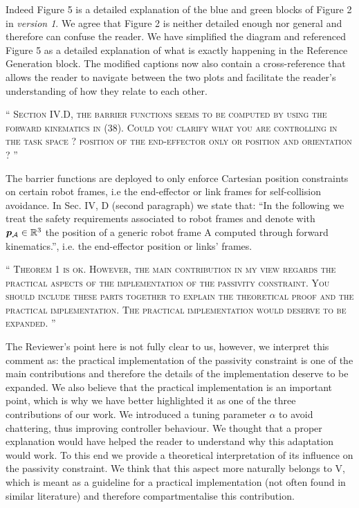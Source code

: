 \documentclass[10pt]{article}
\newcommand{\referee}[1]{\;
  \begin{minipage}[t]{.95\textwidth}
    ``{\small\color{red} \textsc{#1}}''
  \end{minipage}\medskip
  }
\newcommand{\version}[1]{\textit{version #1}}
\begin{document}
\begin{enumerate}[label={[R5:\,\arabic{enumi}]}]
Indeed Figure 5 is a detailed explanation of the blue and green blocks of Figure 2 in \version{1}. We agree that Figure 2 is neither detailed enough nor general and therefore can confuse the reader. We have simplified the diagram and referenced Figure 5 as a detailed explanation of what is exactly happening in the Reference Generation block. The modified captions now also contain a cross-reference that allows the reader to navigate between the two plots and facilitate the reader's understanding of how they relate to each other.

\item\label{reply:R5:7} 
\referee{Section IV.D, the barrier functions seems to be computed by using the forward kinematics in (38). Could you clarify what you are controlling in the task space ? position of the end-effector only or position and orientation ? }

The barrier functions are deployed to only enforce Cartesian position constraints on certain robot frames, i.e the end-effector or link frames for self-collision avoidance. In Sec. IV, D (second paragraph) we state that:
“In the following we treat the safety requirements associated to robot frames and denote with $\bm{p}_\mathcal{A} \in \mathbb{R}^{3}$ the position of a generic robot frame A computed through forward kinematics.”, i.e. the end-effector position or links' frames.

\item\label{reply:R5:8} 
\referee{Theorem 1 is ok. However, the main contribution in my view regards the practical aspects of the implementation of the passivity constraint. You should include these parts together to explain the theoretical proof and the practical implementation.  The practical implementation would deserve to be expanded. }

The Reviewer's point here is not fully clear to us, however, we interpret this comment as: the practical implementation of the passivity constraint is one of the main contributions and therefore the details of the implementation deserve to be expanded. We also believe that the practical implementation is an important point, which is why we have better highlighted it as one of the three contributions of our work. We introduced a tuning parameter $\alpha$ to avoid chattering, thus improving controller behaviour. We thought that a proper explanation would have helped the reader to understand why this adaptation would work. To this end we provide a theoretical interpretation of its influence on the passivity constraint. We think that this aspect more naturally belongs to \sect V, which is meant as a guideline for a practical implementation (not often found in similar literature) and therefore compartmentalise this contribution.


\end{enumerate}
\end{document}
